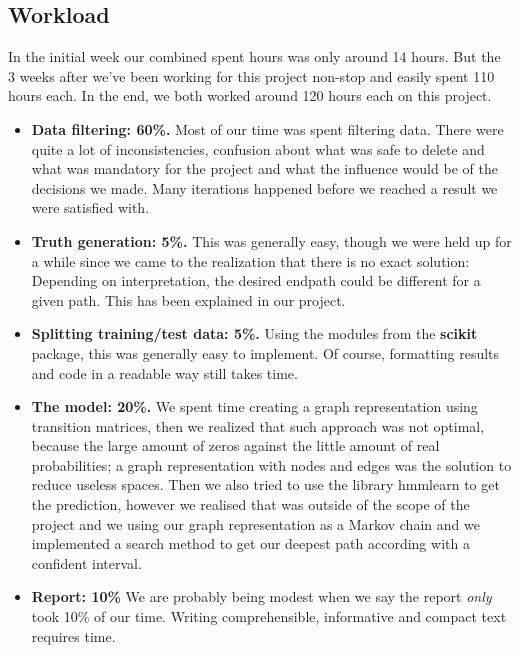 \begin{appendices}

\section{Workload}

In the initial week our combined spent hours was only around 14 hours. But the 3 weeks after we've been working for this project non-stop and easily spent 110 hours each. In the end, we both worked around 120 hours each on this project.
\begin{itemize}
	\item \textbf{Data filtering: 60\%.} Most of our time was spent filtering data. There were quite a lot of inconsistencies, confusion about what was safe to delete and what was mandatory for the project and what the influence would be of the decisions we made. Many iterations happened before we reached a result we were satisfied with.
	\item \textbf{Truth generation: 5\%.} This was generally easy, though we were held up for a while since we came to the realization that there is no exact solution: Depending on interpretation, the desired endpath could be different for a given path. This has been explained in our project.
	\item \textbf{Splitting training/test data: 5\%.} Using the modules from the \textbf{scikit} package, this was generally easy to implement. Of course, formatting results and code in a readable way still takes time.
	\item \textbf{The model: 20\%.} We spent time creating a graph representation using transition matrices, then we realized that such approach was not optimal, because the large amount of zeros against the little amount of real probabilities; a graph representation with nodes and edges was the solution to reduce useless spaces. Then we also tried to use the library hmmlearn to get the prediction, however we realised that was outside of the scope of the project and we using our graph representation as a Markov chain and we implemented a search method to get our deepest path according with a confident interval.
	\item \textbf{Report: 10\%} We are probably being modest when we say the report \textit{only} took 10\% of our time. Writing comprehensible, informative and compact text requires time.
\end{itemize} 

\end{appendices}
